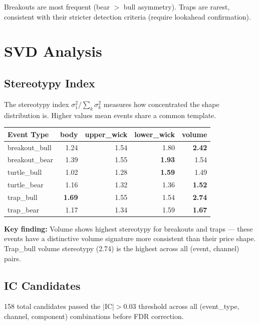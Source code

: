 \documentclass[11pt,a4paper]{article}
\begin{document}
Breakouts are most frequent (bear $>$ bull asymmetry).  Traps are rarest,
consistent with their stricter detection criteria (require lookahead
confirmation).

\section{SVD Analysis}

\subsection{Stereotypy Index}

The stereotypy index $\sigma_1^2 / \sum_k \sigma_k^2$ measures how
concentrated the shape distribution is.  Higher values mean events share a
common template.

\begin{center}
\small
\begin{tabular}{lrrrr}
\hline
\textbf{Event Type} & \textbf{body} & \textbf{upper\_wick} & \textbf{lower\_wick} & \textbf{volume} \\
\hline
breakout\_bull  & 1.24 & 1.54 & 1.80 & \textbf{2.42} \\
breakout\_bear  & 1.39 & 1.55 & \textbf{1.93} & 1.54 \\
turtle\_bull    & 1.02 & 1.28 & \textbf{1.59} & 1.49 \\
turtle\_bear    & 1.16 & 1.32 & 1.36 & \textbf{1.52} \\
trap\_bull      & \textbf{1.69} & 1.55 & 1.54 & \textbf{2.74} \\
trap\_bear      & 1.17 & 1.34 & 1.59 & \textbf{1.67} \\
\hline
\end{tabular}
\end{center}

\textbf{Key finding:} Volume shows highest stereotypy for breakouts and traps
--- these events have a distinctive volume signature more consistent than their
price shape.  Trap\_bull volume stereotypy (2.74) is the highest across all
(event, channel) pairs.

\subsection{IC Candidates}

158 total candidates passed the $|\text{IC}| > 0.03$ threshold across all
(event\_type, channel, component) combinations before FDR correction.
\end{document}
